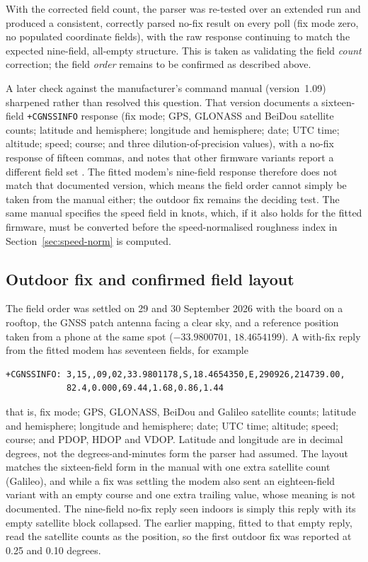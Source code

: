 With the corrected field count, the parser was re-tested over an extended run and produced a consistent, correctly parsed no-fix result on every poll (fix mode zero, no populated coordinate fields), with the raw response continuing to match the expected nine-field, all-empty structure. This is taken as validating the field \emph{count} correction; the field \emph{order} remains to be confirmed as described above.

A later check against the manufacturer's command manual (version~1.09) sharpened rather than resolved this question. That version documents a sixteen-field \texttt{+CGNSSINFO} response (fix mode; GPS, GLONASS and BeiDou satellite counts; latitude and hemisphere; longitude and hemisphere; date; UTC time; altitude; speed; course; and three dilution-of-precision values), with a no-fix response of fifteen commas, and notes that other firmware variants report a different field set \cite{simcoma76xx}. The fitted modem's nine-field response therefore does not match that documented version, which means the field order cannot simply be taken from the manual either; the outdoor fix remains the deciding test. The same manual specifies the speed field in knots, which, if it also holds for the fitted firmware, must be converted before the speed-normalised roughness index in Section~\ref{sec:speed-norm} is computed.

\subsection{Outdoor fix and confirmed field layout}
\label{sec:gnss-outdoor}

The field order was settled on 29 and 30 September 2026 with the board on a rooftop, the GNSS patch antenna facing a clear sky, and a reference position taken from a phone at the same spot ($-33.9800701$, $18.4654199$). A with-fix reply from the fitted modem has seventeen fields, for example

\begin{verbatim}
+CGNSSINFO: 3,15,,09,02,33.9801178,S,18.4654350,E,290926,214739.00,
            82.4,0.000,69.44,1.68,0.86,1.44
\end{verbatim}

that is, fix mode; GPS, GLONASS, BeiDou and Galileo satellite counts; latitude and hemisphere; longitude and hemisphere; date; UTC time; altitude; speed; course; and PDOP, HDOP and VDOP. Latitude and longitude are in decimal degrees, not the degrees-and-minutes form the parser had assumed. The layout matches the sixteen-field form in the manual with one extra satellite count (Galileo), and while a fix was settling the modem also sent an eighteen-field variant with an empty course and one extra trailing value, whose meaning is not documented. The nine-field no-fix reply seen indoors is simply this reply with its empty satellite block collapsed. The earlier mapping, fitted to that empty reply, read the satellite counts as the position, so the first outdoor fix was reported at 0.25 and 0.10 degrees.

